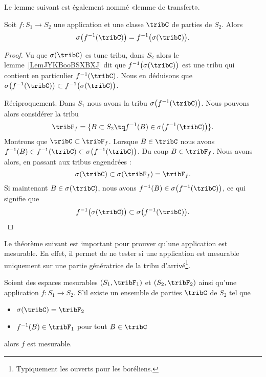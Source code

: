 Le lemme suivant est également nommé «lemme de transfert».
\begin{lemma}       \label{LemOQTBooWGYuDU}
    Soit \( f\colon S_1\to S_2\) une application et une classe \( \tribC\) de parties de \( S_2\). Alors
    \begin{equation}
        \sigma\big( f^{-1}(\tribC) \big)=f^{-1}\big( \sigma(\tribC) \big).
    \end{equation}
\end{lemma}

\begin{proof}
    Vu que \( \sigma(\tribC)\) es tune tribu, dans \( S_2\) alors le lemme~\ref{LemJYKBooBSXBXJ} dit que \( f^{-1}\big( \sigma(\tribC) \big)\) est une tribu qui contient en particulier \(  f^{-1}(\tribC) \). Nous en déduisons que \( \sigma\big( f^{-1}(\tribC) \big)\subset f^{-1}\big( \sigma(\tribC) \big)\).

    Réciproquement. Dans \( S_1\) nous avons la tribu \( \sigma\big( f^{-1}(\tribC) \big)\). Nous pouvons alors considérer la tribu
    \begin{equation}
        \tribF_f=\{ B\subset S_2\tq f^{-1}(B)\in\sigma\big( f^{-1}(\tribC) \big) \}.
    \end{equation}
    Montrons que \( \tribC\subset \tribF_f\). Lorsque \( B\in \tribC\) nous avons \( f^{-1}(B)\in f^{-1}(\tribC)\subset\sigma\big( f^{-1}(\tribC) \big)\). Du coup \( B\in \tribF_f\). Nous avons alors, en passant aux tribus engendrées :
    \begin{equation}
        \sigma(\tribC)\subset\sigma(\tribF_f)=\tribF_f.
    \end{equation}
    Si maintenant \( B\in\sigma(\tribC)\), nous avons \( f^{-1}(B)\in \sigma\big( f^{-1}(\tribC) \big)\), ce qui signifie que
    \begin{equation}
        f^{-1}\big( \sigma(\tribC) \big)\subset\sigma\big( f^{-1}(\tribC) \big).
    \end{equation}
\end{proof}

Le théorème suivant est important pour prouver qu'une application est mesurable. En effet, il permet de ne tester si une application est mesurable uniquement sur une partie génératrice de la tribu d'arrivé\footnote{Typiquement les ouverts pour les boréliens.}.
\begin{theorem}     \label{ThoECVAooDUxZrE}
    Soient des espaces mesurables \( ( S_1,\tribF_1 )\) et \( (S_2,\tribF_2)\) ainsi qu'une application \( f\colon S_1\to S_2\). S'il existe un ensemble de parties \( \tribC\) de \( S_2\) tel que
    \begin{itemize}
        \item \( \sigma(\tribC)=\tribF_2\)
        \item \( f^{-1}(B) \in \tribF_1 \) pour tout \( B\in \tribC\)
    \end{itemize}
    alors \( f\) est mesurable.
\end{theorem}

